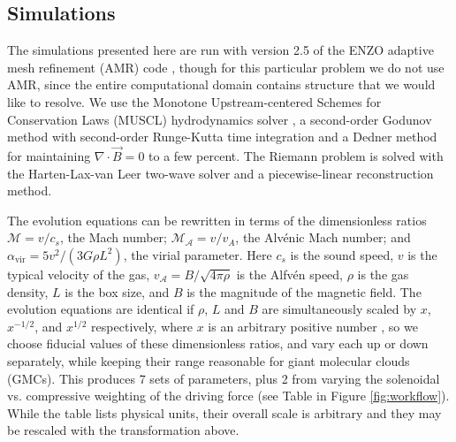 \documentclass[twocolumn]{aastex63}
\begin{document}
\subsection{Simulations} 

The simulations presented here are run with version 2.5 of the ENZO adaptive mesh refinement (AMR) code \citep{Bryan_2014, Brummel-Smith2019}, though for this particular problem we do not use AMR, since the entire computational domain contains structure that we would like to resolve. We use the Monotone Upstream-centered Schemes for Conservation Laws (MUSCL) hydrodynamics solver \citep{WangAndAbel_2009}, a second-order Godunov method with second-order Runge-Kutta time integration and a Dedner method \citep{Dedner_2002}  for maintaining $\nabla \cdot \vec{B} = 0$ to a few percent. The Riemann problem is solved with the Harten-Lax-van Leer two-wave solver \citep{toro_1997} and a piecewise-linear reconstruction method.  

The evolution equations can be rewritten in terms of the dimensionless ratios $\mathcal{M}=v/c_s$, the Mach number; $\mathcal{M_A}=v/v_A$, the Alv\'enic Mach number; and $\alpha_\mathrm{vir} = 5 v^2 / (3 G \rho L^2)$, the virial parameter. Here $c_s$ is the sound speed, $v$ is the typical velocity of the gas, $v_\mathcal{A}=B/\sqrt{4\pi\rho}$ is the Alfv\'en speed, $\rho$ is the gas density, $L$ is the box size, and $B$ is the magnitude of the magnetic field. The evolution equations are identical if $\rho$, $L$ and $B$ are simultaneously scaled by $x$, $x^{-1/2}$, and $x^{1/2}$ respectively, where $x$ is an arbitrary positive number \citep{McKee_2010, Krumholz_2011}, so we choose fiducial values of these dimensionless ratios, and vary each up or down separately, while keeping their range reasonable for giant molecular clouds (GMCs). This produces 7 sets of parameters, plus 2 from varying the solenoidal vs. compressive weighting of the driving force (see Table in Figure \ref{fig:workflow}). While the table lists physical units, their overall scale is arbitrary and they may be rescaled with the transformation above.
\end{document}
